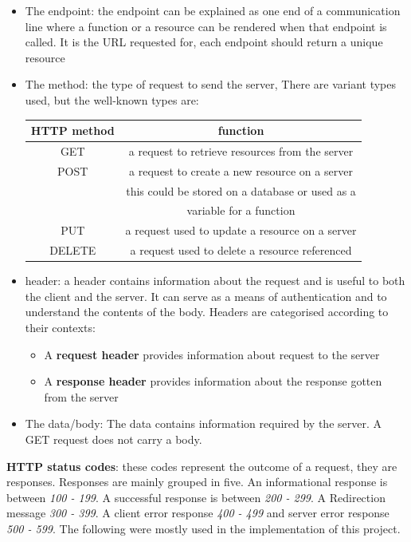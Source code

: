 \begin{itemize}
\item The endpoint: the endpoint can be explained as one end of a communication line where a function or a resource can be rendered when that endpoint is called. It is the \gls{URL} requested for, each endpoint should return a unique resource
\item The method: the type of request to send the server, There are variant types used, but the well-known types are:
\begin{center}
  \begin{tabular}{|c|   c   |}
    \hline
    \textbf{HTTP method} & function\\
    \hline
    GET & a request to retrieve resources from the server\\
    \hline
    POST & a request to create a new resource on a server\\
    & this could be stored on a database or used as a\\
    & variable for a function\\
    \hline
    PUT & a request used to update a resource on a server\\
    \hline
    DELETE & a request used to delete a resource referenced\\
    \hline
  \end{tabular}
\end{center}
\item header: a header contains information about the request and is useful to both the client and the server. It can serve as a means of authentication and to understand the contents of the body. Headers are categorised according to their contexts:
\begin{itemize}
  \item A \textbf{request header} provides information about request to the server
  \item A \textbf{response header} provides information about the response gotten from the server
\end{itemize}
\item The data/body: The data contains information required by the server. A GET request does not carry a body.
\end{itemize}
\textbf{HTTP status codes}: these codes represent the outcome of a request, they are responses. Responses are mainly grouped in five.\cite{HTTPresp7:online} An informational response is between \textit{100 - 199}. A successful response is between \textit{200 - 299}. A Redirection message \textit{300 - 399}. A client error response \textit{400 - 499} and server error response \textit{500 - 599}. The following were mostly used in the implementation of this project.

